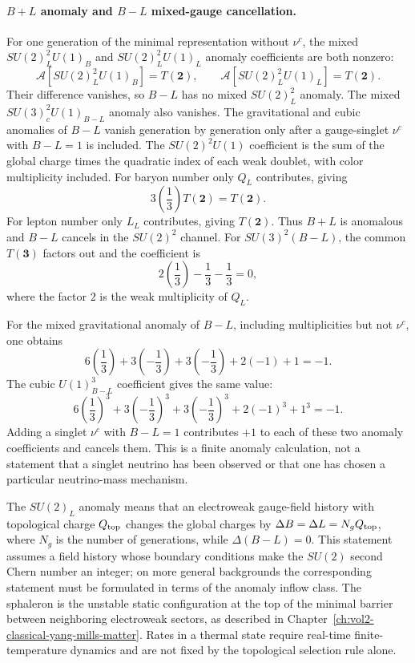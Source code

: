 \paragraph{\(B+L\) anomaly and \(B-L\) mixed-gauge cancellation.}
For one generation of the minimal representation without \(\nu^c\), the
mixed \(SU(2)_L^2U(1)_B\) and \(SU(2)_L^2U(1)_L\) anomaly coefficients are
both nonzero:
\[
  \mathcal A[SU(2)_L^2U(1)_B]=T(\mathbf2),\qquad
  \mathcal A[SU(2)_L^2U(1)_L]=T(\mathbf2).
\]
Their difference vanishes, so \(B-L\) has no mixed
\(SU(2)_L^2\) anomaly.  The mixed \(SU(3)_c^2U(1)_{B-L}\) anomaly also
vanishes.  The gravitational and cubic anomalies of \(B-L\) vanish
generation by generation only after a gauge-singlet \(\nu^c\) with
\(B-L=1\) is included.
The \(SU(2)^2U(1)\) coefficient is the sum of the global charge times the
quadratic index of each weak doublet, with color multiplicity included.  For
baryon number only \(Q_L\) contributes, giving
\[
  3\left(\frac{1}{3}\right)T(\mathbf2)=T(\mathbf2).
\]
For lepton number only \(L_L\) contributes, giving \(T(\mathbf2)\).  Thus
\(B+L\) is anomalous and \(B-L\) cancels in the \(SU(2)^2\) channel.  For
\(SU(3)^2(B-L)\), the common \(T(\mathbf3)\) factors out and the coefficient
is
\[
  2\left(\frac{1}{3}\right)-\frac{1}{3}-\frac{1}{3}=0,
\]
where the factor \(2\) is the weak multiplicity of \(Q_L\).

For the mixed gravitational anomaly of \(B-L\), including multiplicities but
not \(\nu^c\), one obtains
\[
  6\left(\frac{1}{3}\right)
  +3\left(-\frac{1}{3}\right)
  +3\left(-\frac{1}{3}\right)
  +2(-1)+1=-1 .
\]
The cubic \(U(1)_{B-L}^3\) coefficient gives the same value:
\[
  6\left(\frac{1}{3}\right)^3
  +3\left(-\frac{1}{3}\right)^3
  +3\left(-\frac{1}{3}\right)^3
  +2(-1)^3+1^3=-1 .
\]
Adding a singlet \(\nu^c\) with \(B-L=1\) contributes \(+1\) to each of
these two anomaly coefficients and cancels them.  This is a finite anomaly
calculation, not a statement that a singlet neutrino has been observed or that
one has chosen a particular neutrino-mass mechanism.

\begin{remark}
The \(SU(2)_L\) anomaly means that an electroweak gauge-field history with
topological charge \(Q_{\rm top}\) changes the global charges by
\(\Delta B=\Delta L=N_gQ_{\rm top}\), where \(N_g\) is the number of
generations, while \(\Delta(B-L)=0\).  This statement assumes a field history
whose boundary conditions make the \(SU(2)\) second Chern number an integer;
on more general backgrounds the corresponding statement must be formulated in
terms of the anomaly inflow class.  The sphaleron is the unstable static
configuration at the top of the minimal barrier between neighboring
electroweak sectors, as described in
Chapter~\ref{ch:vol2-classical-yang-mills-matter}.  Rates in a thermal state
require real-time finite-temperature dynamics and are not fixed by the
topological selection rule alone.
\end{remark}

